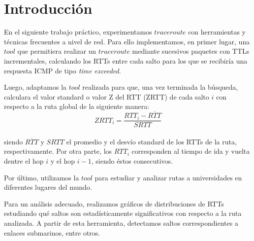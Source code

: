 \documentclass[10pt, a4paper]{article}
\author{Teor\'ia de las Comunicaciones, DC, UBA.}
\date{}
\title{}
\begin{document}
	
\thispagestyle{empty}

\maketitle

\tableofcontents
\newpage

\section{Introducción}

En el siguiente trabajo práctico, experimentamos $traceroute$ con herramientas y técnicas frecuentes a nivel de red. Para ello implementamos, en primer lugar, una $tool$ que permitiera realizar un $traceroute$ mediante sucesivos paquetes con TTLs incrementales, calculando los RTTs entre cada salto para los que se recibiría una respuesta ICMP de tipo \textit{time exceeded}. 

Luego, adaptamos la $tool$ realizada para que, una vez terminada la búsqueda, calculara el valor standard o valor Z del RTT (ZRTT) de cada salto $i$ con respecto a la ruta global de la siguiente manera: \\
$$ZRTT_i = \frac{RTT_i - \overline{RTT}}{SRTT}$$\\
siendo $\overline{RTT}$ y $SRTT$ el promedio y el desvío standard de los RTTs de la ruta, respectivamente. Por otra parte, los $RTT_i$ corresponden al tiempo de ida y vuelta dentre el hop $i$ y el hop $i-1$, siendo éstos consecutivos.

Por último, utilizamos la $tool$ para estudiar y analizar rutas a universidades en diferentes lugares del mundo.

Para un análisis adecuado, realizamos gráficos de distribuciones de RTTs estudiando qué saltos son estadísticamente significativos con respecto a la ruta analizada. A partir de esta herramienta, detectamos saltos correspondientes a enlaces submarinos, entre otros. 
\end{document}
